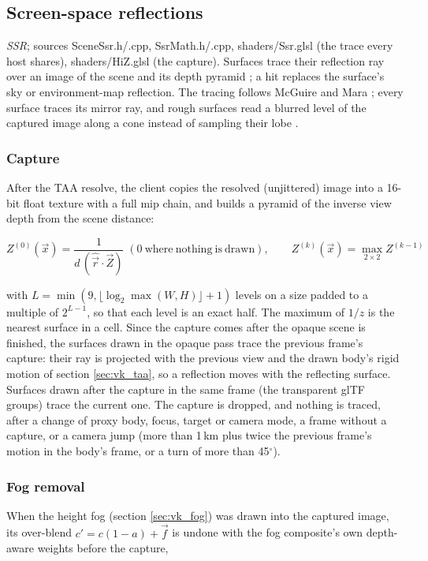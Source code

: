 \documentclass[Orbiter Technical Reference.tex]{subfiles}
\begin{document}
\begin{sloppypar}
\subsection{Screen-space reflections}\label{sec:vk_ssr}
\textit{SSR}; sources SceneSsr.h/.cpp, SsrMath.h/.cpp, shaders/Ssr.glsl (the trace every host shares), shaders/HiZ.glsl (the capture). Surfaces trace their reflection ray over an image of the scene and its depth pyramid \cite{uludag2014}; a hit replaces the surface's sky or environment-map reflection. The tracing follows McGuire and Mara \cite{mcguire2014}; every surface traces its mirror ray, and rough surfaces read a blurred level of the captured image along a cone instead of sampling their lobe \cite{uludag2014}.

\subsubsection{Capture}
After the TAA resolve, the client copies the resolved (unjittered) image into a 16-bit float texture with a full mip chain, and builds a pyramid of the inverse view depth from the scene distance:

\[ Z^{(0)}(\vec{x}) = \frac{1}{d\,(\hat{\vec{r}} \cdot \vec{Z})} \;(0 \mathrm{\ where\ nothing\ is\ drawn}), \qquad Z^{(k)}(\vec{x}) = \max_{2 \times 2} Z^{(k-1)} \]

\noindent
with $L = \min(9, \lfloor\log_{2}\max(W,H)\rfloor + 1)$ levels on a size padded to a multiple of $2^{L-1}$, so that each level is an exact half. The maximum of $1/z$ is the nearest surface in a cell. Since the capture comes after the opaque scene is finished, the surfaces drawn in the opaque pass trace the previous frame's capture: their ray is projected with the previous view and the drawn body's rigid motion of section \ref{sec:vk_taa}, so a reflection moves with the reflecting surface. Surfaces drawn after the capture in the same frame (the transparent glTF groups) trace the current one. The capture is dropped, and nothing is traced, after a change of proxy body, focus, target or camera mode, a frame without a capture, or a camera jump (more than 1\,km plus twice the previous frame's motion in the body's frame, or a turn of more than 45$^{\circ}$).

\subsubsection{Fog removal}
When the height fog (section \ref{sec:vk_fog}) was drawn into the captured image, its over-blend $c' = c(1 - a) + \vec{f}$ is undone with the fog composite's own depth-aware weights before the capture,


\end{sloppypar}
\end{document}
